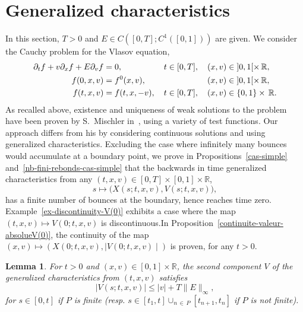 \documentclass[10pt]{amsart}
\newtheorem{lemm}[theo]{Lemma}\newtheorem{prop}[theo]{Proposition}\newtheorem{coro}[theo]{Corollary}\newtheorem{conj}[theo]{Conjecture}
\theoremstyle{definition}\newtheorem{defi}[theo]{Definition}\newtheorem{rema}[theo]{Remark}\newtheorem{exam}[theo]{Example}\newtheorem{exem}[theo]{Example}\newtheorem{nota}[theo]{Notation}
\newcommand{\R}{\mathbb{R}}
\begin{document}
\section{Generalized characteristics}\label{generalized-characteristics}

In this section, $T>0$ and $E\in C([0,T] ; C^1([0,1]))$ are given. We consider the Cauchy problem for the Vlasov equation,
\begin{align}
\partial_t f+ v \partial_x f+ E\partial_v f &= 0, \mkern90mu t\in [0,T],\quad (x,v) \in\;]0,1[\times \,\R, \label{VP-f-2}
\\
f(0,x,v) &= f^0(x,v), \mkern133mu (x,v) \in\;]0,1[\times \,\R, \label{init-f-2}
\\
f(t,x,v) &= f(t,x,-v), \quad t\in [0,T], \quad (x,v) \in \{ 0,1\} \times \,\R. \label{boundaries-f-2}
\end{align}
As recalled above, existence and uniqueness of weak solutions to the problem have been proven by S.~Mischler in~\cite{Mis99}, using a variety of test functions. Our appr\-oach differs from his by considering continuous solutions and using generalized characteristics. Excluding the case where infinitely many bounces would accumulate at a boundary point, we prove in Propositions~\ref{cas-simple} and~\ref{nb-fini-rebonds-cas-simple} that the backwards in time generalized characteristics from any $(t,x,v)\in [0,T]
\times [0,1] \times \R$,
\[
s \mapsto \big(X(s;t,x,v), V(s;t,x,v)\big),
\]
has a finite number of bounces at the boundary, hence reaches time zero. Example~\ref{ex-discontinuity-V(0)} exhibits a case where the map $(t,x,v)\mapsto V(0;t,x,v)$ is discontinuous.\linebreak In Proposition~\ref{continuite-valeur-absolueV(0)}, the continuity of the map $(x,v) \mapsto (X(0;t,x,v), \mid V(0;t,x,v)\mid)$ is proven, for any $t>0$.

\begin{lemm}\label{V-bounded}
For $t>0$ and $(x,v)\in [0,1] \times \R$, the second component $V$ of the generalized characteristics from $(t,x,v)$ satisfies
\begin{equation}\label{v_bounded}
\left| V(s;t,x,v) \right| \leq |v| + T \| E \|_{\infty},
\end{equation}
for $s\in [0,t]$ if $P$ is finite (resp. $s\in [t_1,t] \cup _{n\,\in\,P}[t_{n+1},t_n] $ if $P$ is not finite).
\end{lemm}
\end{document}
